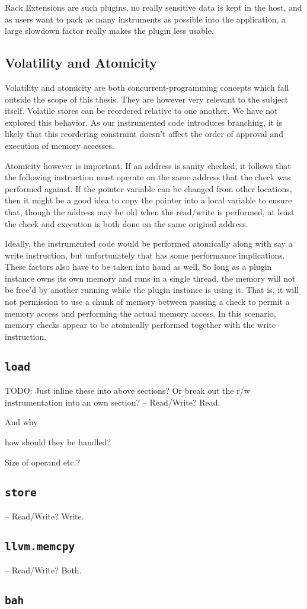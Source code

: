 Rack Extensions are such plugins, no really sensitive data is kept in the host,
and as users want to pack as many instruments as possible into the application,
a large slowdown factor really makes the plugin less usable.

\subsection {Volatility and Atomicity}

Volatility and atomicity are both concurrent-programming concepts which fall
outside the scope of this thesis. They are however very relevant to the subject
itself. Volatile stores can be reordered relative to one another. We have not
explored this behavior. As our instrumented code introduces branching, it is
likely that this reordering constraint doesn't affect the order of approval and
execution of memory accesses.

Atomicity however is important. If an address is sanity checked, it follows that
the following instruction must operate on the same address that the check was
performed against. If the pointer variable can be changed from other locations,
then it might be a good idea to copy the pointer into a local variable to ensure
that, though the address may be old when the read/write is performed, at least
the check and execution is both done on the same original address.

Ideally, the instrumented code would be performed atomically along with say a
write instruction, but unfortunately that has some performance implications.
These factors also have to be taken into hand as well. So long as a plugin
instance owns its own memory and runs in a single thread, the memory will not be
free'd by another running while the plugin instance is using it. That is, it
will not permission to use a chunk of memory between passing a check to permit a
memory access and performing the actual memory access. In this scenario, memory
checks appear to be atomically performed together with the write instruction.

\subsection {\texttt{load}}

TODO: Just inline these into above sections? Or break out the r/w
instrumentation into an own section?
-- Read/Write? Read.

And why

how should they be handled?

Size of operand etc.?

\subsection {\texttt{store}}

-- Read/Write? Write.

\subsection {\texttt{llvm.memcpy}}

-- Read/Write? Both.

\subsection {\texttt{bah}}

